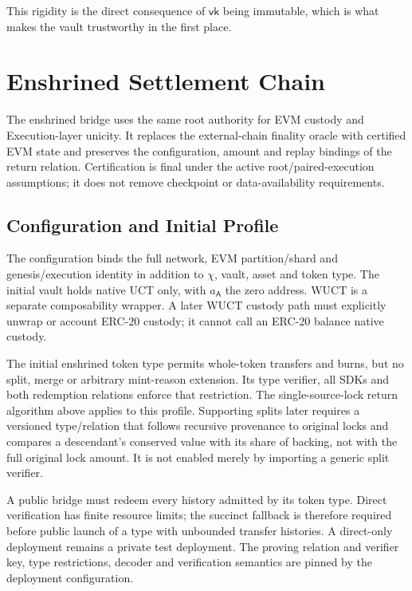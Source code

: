 This rigidity is the direct consequence of $\mathsf{vk}$ being immutable, which is what makes the vault trustworthy in the first place.

\section{Enshrined Settlement Chain}\label{app:bridging-enshrined}

The enshrined bridge uses the same root authority for EVM custody and Execution-layer unicity. It replaces the external-chain finality oracle with certified EVM state and preserves the configuration, amount and replay bindings of the return relation. Certification is final under the active root/paired-execution assumptions; it does not remove checkpoint or data-availability requirements.

\subsection{Configuration and Initial Profile}

The configuration binds the full network, EVM partition/shard and genesis/execution identity in addition to $\chi$, vault, asset and token type. The initial vault holds native UCT only, with $a_\mathsf{A}$ the zero address. WUCT is a separate composability wrapper. A later WUCT custody path must explicitly unwrap or account ERC-20 custody; it cannot call an ERC-20 balance native custody.

The initial enshrined token type permits whole-token transfers and burns, but no split, merge or arbitrary mint-reason extension. Its type verifier, all SDKs and both redemption relations enforce that restriction. The single-source-lock return algorithm above applies to this profile. Supporting splits later requires a versioned type/relation that follows recursive provenance to original locks and compares a descendant's conserved value with its share of backing, not with the full original lock amount. It is not enabled merely by importing a generic split verifier.

A public bridge must redeem every history admitted by its token type. Direct verification has finite resource limits; the succinct fallback is therefore required before public launch of a type with unbounded transfer histories. A direct-only deployment remains a private test deployment. The proving relation and verifier key, type restrictions, decoder and verification semantics are pinned by the deployment configuration.

